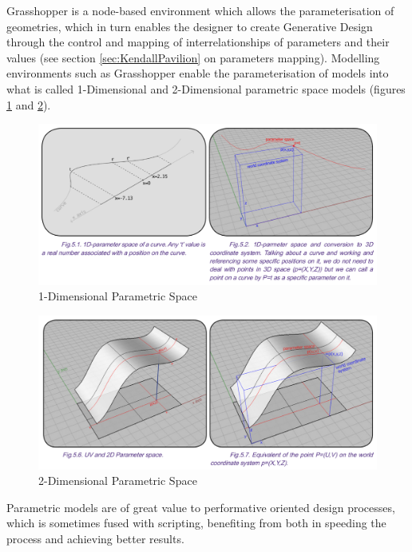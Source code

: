 Grasshopper is a node-based environment which allows the parameterisation of geometries, which in turn enables the designer to create Generative Design through the control and mapping of interrelationships of parameters and their values (see section \ref{sec:KendallPavilion} on parameters mapping). Modelling environments such as Grasshopper enable the parameterisation of models into what is called 1-Dimensional and 2-Dimensional parametric space models (figures \ref{fig:1DSpace} and \ref{fig:2DSpace}).

\begin{figure}[h]
	\centering
	\includegraphics[width=\textwidth]{./Images/21-1DSpace}
	\caption[1-Dimensional Parametric Space]{1-Dimensional Parametric Space \cite{khazabi12}}
	\label{fig:1DSpace}
\end{figure}

\begin{figure}[h]
	\centering
	\includegraphics[width=\textwidth]{./Images/22-2DSpace}
	\caption[2-Dimensional Parametric Space]{2-Dimensional Parametric Space \cite{khazabi12}}
	\label{fig:2DSpace}
\end{figure}

Parametric models are of great value to performative oriented design processes, which is sometimes fused with scripting, benefiting from both in speeding the process and achieving better results.


